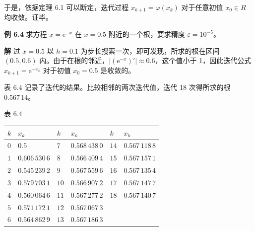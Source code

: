 \documentclass[
  10pt,
  fontset=fandol]{ctexart}
\newcounter{none} %
\begin{document}
于是，依据定理 6.1 可以断定，迭代过程 \(x_{k+1}=\varphi(x_k)\) 对于任意初值 \(x_0\in R\) 均收敛。证毕。

\textbf{例 6.4} 求方程 \(x=\mathrm{e}^{-x}\) 在 \(x=0.5\) 附近的一个根，要求精度 \(\varepsilon=10^{-5}\)。

\textbf{解} 过 \(x=0.5\) 以 \(h=0.1\) 为步长搜索一次，即可发现，所求的根在区间 \((0.5,0.6)\) 内。由于在根的邻近，\(|(\mathrm{e}^{-x})'|\approx0.6\)，这个值小于 1，因此迭代公式 \(x_{k+1}=\mathrm{e}^{-x_k}\) 对于初值 \(x_0=0.5\) 是收敛的。

表 6.4 记录了迭代的结果。比较相邻的两次迭代值，迭代 18 次得所求的根 \(0.567\,14\)。

表 6.4

{\def\LTcaptype{none} %
\begin{longtable}[]{@{}
  >{\raggedright\arraybackslash}p{}
  >{\raggedright\arraybackslash}p{}
  >{\raggedright\arraybackslash}p{}
  >{\raggedright\arraybackslash}p{}
  >{\raggedright\arraybackslash}p{}
  >{\raggedright\arraybackslash}p{}@{}}
\toprule\noalign{}
\begin{minipage}[b]{\linewidth}\raggedright
\(k\)
\end{minipage} & \begin{minipage}[b]{\linewidth}\raggedright
\(x_k\)
\end{minipage} & \begin{minipage}[b]{\linewidth}\raggedright
\(k\)
\end{minipage} & \begin{minipage}[b]{\linewidth}\raggedright
\(x_k\)
\end{minipage} & \begin{minipage}[b]{\linewidth}\raggedright
\(k\)
\end{minipage} & \begin{minipage}[b]{\linewidth}\raggedright
\(x_k\)
\end{minipage} \\
\midrule\noalign{}
\endhead
\bottomrule\noalign{}
\endlastfoot
\(0\) & \(0.5\) & \(7\) & \(0.568\,438\,0\) & \(14\) & \(0.567\,118\,8\) \\
\(1\) & \(0.606\,530\,6\) & \(8\) & \(0.566\,409\,4\) & \(15\) & \(0.567\,157\,1\) \\
\(2\) & \(0.545\,239\,2\) & \(9\) & \(0.567\,559\,6\) & \(16\) & \(0.567\,135\,4\) \\
\(3\) & \(0.579\,703\,1\) & \(10\) & \(0.566\,907\,2\) & \(17\) & \(0.567\,147\,7\) \\
\(4\) & \(0.560\,064\,6\) & \(11\) & \(0.567\,277\,2\) & \(18\) & \(0.567\,140\,7\) \\
\(5\) & \(0.571\,172\,1\) & \(12\) & \(0.567\,067\,3\) & & \\
\(6\) & \(0.564\,862\,9\) & \(13\) & \(0.567\,186\,3\) & & \\
\end{longtable}
}
\end{document}
